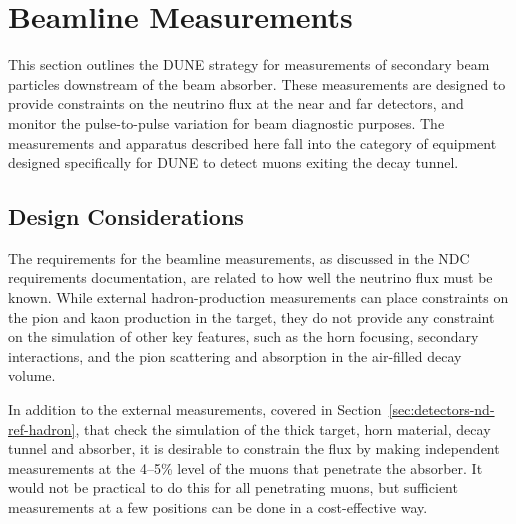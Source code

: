 \section{Beamline Measurements} 
\label{sec:detectors-nd-ref-blm}

This section outlines the DUNE strategy for measurements of secondary
beam particles downstream of  the beam absorber. 
These measurements are designed to provide constraints 
on the neutrino flux at the near and far
detectors, and monitor the pulse-to-pulse variation
 for beam diagnostic purposes. 
The measurements and apparatus described here fall into
the category of equipment designed specifically for DUNE to
detect muons exiting the decay tunnel. 

\subsection{Design Considerations}
\label{subsec:detectors-nd-blm-design}

\begin{sloppypar}
The requirements for the beamline measurements,
as discussed in the NDC requirements documentation\cite{lbnfdune-cdr-req}, 
are related to how well the neutrino flux must be known.
While external hadron-production measurements can place 
constraints on the pion and kaon production in the target, they do not 
provide any constraint on the simulation of other key features, such 
as the horn focusing, secondary interactions, and the 
pion scattering and absorption in the air-filled decay volume. 

In addition to the external measurements, covered in
Section~\ref{sec:detectors-nd-ref-hadron}, that check the
simulation of the thick target, horn material, decay tunnel and
absorber, it is desirable to constrain the flux by making independent
measurements at the 4--5\% level of the muons that penetrate the
absorber. It would not be practical to do this for all penetrating
muons, but sufficient measurements at a few positions can be done in a
cost-effective way.
\end{sloppypar}
%

